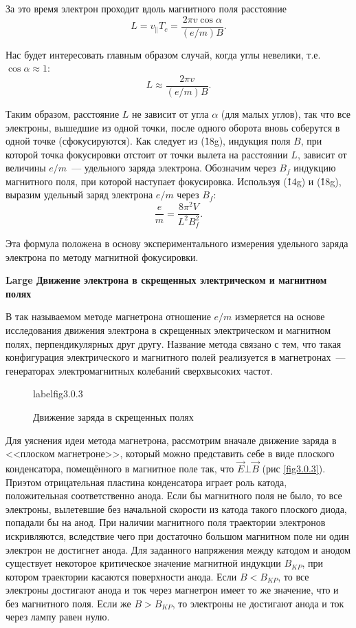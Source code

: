 За это время электрон проходит вдоль магнитного поля расстояние
\begin{equation}
L = v_{\parallel}T_c =\frac{2\pi v\cos\alpha}{(e/m)B}.
\end{equation}

Нас будет интересовать главным образом случай, когда углы невелики, т.е. $\cos\alpha \approx 1$:
\begin{equation}
L \approx \frac{2\pi v}{(e/m)B}.
\end{equation}

Таким образом, расстояние $L$ не зависит от угла $\alpha$ (для малых углов), так что все электроны, вышедшие из одной точки, после одного оборота вновь соберутся в одной точке (сфокусируются). Как следует из (\r{18g}), индукция поля $B$, при которой точка фокусировки отстоит от точки вылета на расстоянии $L$, зависит от величины $e/m$~--- удельного заряда электрона. Обозначим через $B_f$ индукцию магнитного поля, при которой наступает фокусировка. Используя (\r{14g}) и (\r{18g}), выразим удельный заряд электрона $e/m$ через $B_f$:
\begin{equation}
\frac{e}{m}=\frac{8\pi^2 V}{L^2B_f^2}.
\end{equation}

Эта формула положена в основу экспериментального измерения удельного заряда электрона по \textsf{методу магнитной
фокусировки}.

{\bf Large Движение электрона в скрещенных электрическом и магнитном полях}

В так называемом {\textsf{методе магнетрона}} отношение $e/m$ измеряется на основе исследования движения электрона в скрещенных электрическом и магнитном полях, перпендикулярных друг другу. Название метода связано с тем, что такая
конфигурация электрического и магнитного полей реализуется в магнетронах~--- генераторах электромагнитных колебаний
сверхвысоких частот.

\begin{figure}
\caption{Движение заряда в скрещенных полях}
label{fig3.0.3}
\end{figure}

Для уяснения идеи метода магнетрона, рассмотрим вначале движение заряда в <<плоском магнетроне>>, который можно
представить себе в виде плоского конденсатора, помещённого в магнитное поле так, что $\vec{E}\bot\vec{B}$ (рис \ref{fig3.0.3}). Приэтом отрицательная пластина конденсатора играет роль катода, положительная соответственно анода. Если бы магнитного поля не было, то все электроны, вылетевшие без начальной скорости из катода такого плоского диода, попадали бы на анод. При наличии магнитного поля траектории электронов искривляются, вследствие чего при достаточно большом магнитном поле ни один электрон не достигнет анода. Для заданного напряжения между катодом и анодом существует некоторое критическое значение магнитной индукции $B_{KP}$, при котором траектории касаются поверхности анода. Если $B<B_{KP}$, то все электроны достигают анода и ток через магнетрон имеет то же значение, что и без магнитного поля. Если же $B>B_{KP}$, то электроны не достигают анода и ток через лампу равен нулю.

